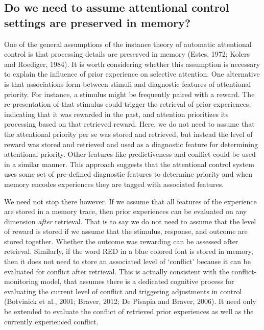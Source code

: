 \documentclass[]{DissertateCUNY}
\begin{document}
\hypertarget{do-we-need-to-assume-attentional-control-settings-are-preserved-in-memory}{%
\subsection{Do we need to assume attentional control settings are
preserved in
memory?}\label{do-we-need-to-assume-attentional-control-settings-are-preserved-in-memory}}

One of the general assumptions of the instance theory of automatic
attentional control is that processing details are preserved in memory
(Estes, 1972; Kolers and Roediger, 1984). It is worth considering
whether this assumption is necessary to explain the influence of prior
experience on selective attention. One alternative is that associations
form between stimuli and diagnostic features of attentional priority.
For instance, a stimulus might be frequently paired with a reward. The
re-presentation of that stimulus could trigger the retrieval of prior
experiences, indicating that it was rewarded in the past, and attention
prioritizes its processing based on that retrieved reward. Here, we do
not need to assume that the attentional priority per se was stored and
retrieved, but instead the level of reward was stored and retrieved and
used as a diagnostic feature for determining attentional priority. Other
features like predictiveness and conflict could be used in a similar
manner. This approach suggests that the attentional control system uses
some set of pre-defined diagnostic features to determine priority and
when memory encodes experiences they are tagged with associated
features.

We need not stop there however. If we assume that all features of the
experience are stored in a memory trace, then prior experiences can be
evaluated on any dimension \textit{after} retrieval. That is to say we
do not need to assume that the level of reward is stored if we assume
that the stimulus, response, and outcome are stored together. Whether
the outcome was rewarding can be assessed after retrieval. Similarly, if
the word RED in a blue colored font is stored in memory, then it does
not need to store an associated level of `conflict' because it can be
evaluated for conflict after retrieval. This is actually consistent with
the conflict-monitoring model, that assumes there is a dedicated
cognitive process for evaluating the current level of conflict and
triggering adjustments in control (Botvinick et al., 2001; Braver, 2012;
De Pisapia and Braver, 2006). It need only be extended to evaluate the
conflict of retrieved prior experiences as well as the currently
experienced conflict.
\end{document}
